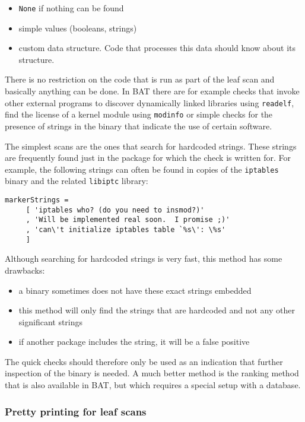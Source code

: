 \documentclass[10pt]{article}
\begin{document}
\begin{itemize}
\item \texttt{None} if nothing can be found
\item simple values (booleans, strings)
\item custom data structure. Code that processes this data should know about
its structure.
\end{itemize}

There is no restriction on the code that is run as part of the leaf scan and
basically anything can be done. In BAT there are for example checks that invoke
other external programs to discover dynamically linked libraries using
\texttt{readelf}, find the license of a kernel module using \texttt{modinfo}
or simple checks for the presence of strings in the binary that indicate the
use of certain software.

The simplest scans are the ones that search for hardcoded strings. These strings
are frequently found just in the package for which the check is written for. For
example, the following strings can often be found in copies of the
\texttt{iptables} binary and the related \texttt{libiptc} library:

\begin{verbatim}
markerStrings =
     [ 'iptables who? (do you need to insmod?)'
     , 'Will be implemented real soon.  I promise ;)'
     , 'can\'t initialize iptables table `%s\': \%s'
     ]
\end{verbatim}

Although searching for hardcoded strings is very fast, this method has some
drawbacks:

\begin{itemize}
\item a binary sometimes does not have these exact strings embedded
\item this method will only find the strings that are hardcoded and not any
other significant strings
\item if another package includes the string, it will be a false positive
\end{itemize}

The quick checks should therefore only be used as an indication that further
inspection of the binary is needed. A much better method is the ranking method
that is also available in BAT, but which requires a special setup with a
database.

\subsubsection{Pretty printing for leaf scans}
\end{document}
